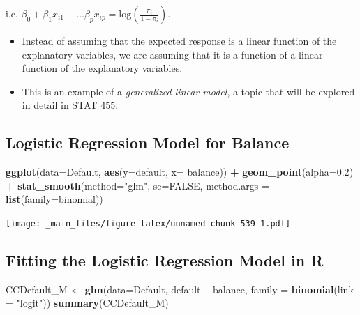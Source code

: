 \documentclass[]{book}
\newenvironment{Shaded}{\begin{snugshade}}{\end{snugshade}}
\newcommand{\KeywordTok}[1]{\textcolor[rgb]{0.13,0.29,0.53}{\textbf{#1}}}
\newcommand{\DataTypeTok}[1]{\textcolor[rgb]{0.13,0.29,0.53}{#1}}
\newcommand{\FloatTok}[1]{\textcolor[rgb]{0.00,0.00,0.81}{#1}}
\newcommand{\StringTok}[1]{\textcolor[rgb]{0.31,0.60,0.02}{#1}}
\newcommand{\OtherTok}[1]{\textcolor[rgb]{0.56,0.35,0.01}{#1}}
\newcommand{\OperatorTok}[1]{\textcolor[rgb]{0.81,0.36,0.00}{\textbf{#1}}}
\newcommand{\NormalTok}[1]{#1}
\begin{document}
i.e.
\(\beta_0+\beta_1x_{i1} + \ldots \beta_px_{ip}= \text{log}\left(\frac{\pi_i}{1-\pi_i}\right)\).

\begin{itemize}
\item
  Instead of assuming that the expected response is a linear function of
  the explanatory variables, we are assuming that it is a function of a
  linear function of the explanatory variables.
\item
  This is an example of a \emph{generalized linear model}, a topic that
  will be explored in detail in STAT 455.
\end{itemize}

\subsection{Logistic Regression Model for
Balance}\label{logistic-regression-model-for-balance}

\begin{Shaded}
\begin{Highlighting}[]
\KeywordTok{ggplot}\NormalTok{(}\DataTypeTok{data=}\NormalTok{Default, }\KeywordTok{aes}\NormalTok{(}\DataTypeTok{y=}\NormalTok{default, }\DataTypeTok{x=}\NormalTok{ balance)) }\OperatorTok{+}\StringTok{ }\KeywordTok{geom_point}\NormalTok{(}\DataTypeTok{alpha=}\FloatTok{0.2}\NormalTok{) }\OperatorTok{+}\StringTok{ }\KeywordTok{stat_smooth}\NormalTok{(}\DataTypeTok{method=}\StringTok{"glm"}\NormalTok{, }\DataTypeTok{se=}\OtherTok{FALSE}\NormalTok{, }\DataTypeTok{method.args =} \KeywordTok{list}\NormalTok{(}\DataTypeTok{family=}\NormalTok{binomial)) }
\end{Highlighting}
\end{Shaded}

\texttt{[image: \_main\_files/figure-latex/unnamed-chunk-539-1.pdf]}

\subsection{Fitting the Logistic Regression Model in
R}\label{fitting-the-logistic-regression-model-in-r}

\begin{Shaded}
\begin{Highlighting}[]
\NormalTok{CCDefault_M <-}\StringTok{ }\KeywordTok{glm}\NormalTok{(}\DataTypeTok{data=}\NormalTok{Default, default }\OperatorTok{~}\StringTok{ }\NormalTok{balance, }\DataTypeTok{family =} \KeywordTok{binomial}\NormalTok{(}\DataTypeTok{link =} \StringTok{"logit"}\NormalTok{))}
\KeywordTok{summary}\NormalTok{(CCDefault_M)}
\end{Highlighting}
\end{Shaded}
\end{document}
